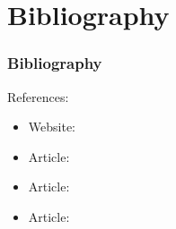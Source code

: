 \documentclass{beamer}
\begin{document}
\section{Bibliography}
\begin{frame}
	\frametitle{Bibliography}
	References:
	\begin{itemize}
		\item Website: \href{https://www.gameranger.com/about/}{}
		\item Article: \href{https://gafferongames.com/post/udp_vs_tcp/}{}
		\item Article: \href{https://1024monkeys.wordpress.com/2014/04/01/game-servers-udp-vs-tcp/}{}
		\item Article: \href{https://gafferongames.com/post/what_every_programmer_needs_to_know_about_game_networking/}{}
	\end{itemize}
\end{frame}

    
\end{document}
